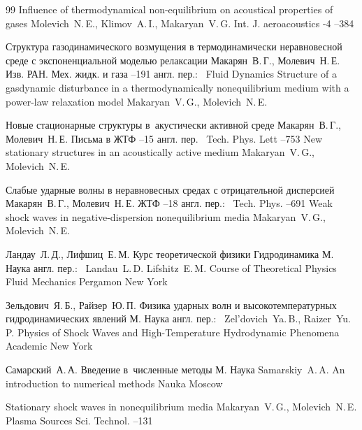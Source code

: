 \begin{thebibliography}{99}
\paper Influence of thermodynamical non-equilibrium on acoustical properties of gases 
\by Molevich~N.\,E.,  Klimov~A.\,I., Makaryan~V.\,G. 
\jour Int. J. aeroacoustics 
-4 
--384


\paper Структура газодинамического возмущения в термодинамически неравновесной среде с экспоненциальной моделью
релаксации 
\by   Макарян~В.\,Г., Молевич~Н.\,Е. 
\jour Изв. РАН. Мех. жидк. и газа 
--191
\transl англ. пер.:~
\jour Fluid Dynamics
\paper Structure of a gasdynamic disturbance in a thermodynamically nonequilibrium medium with a power-law relaxation model
\by Makaryan~V.\,G., Molevich~N.\,E.



\paper Новые стационарные структуры в~акустически активной среде 
\by   Макарян~В.\,Г., Молевич~Н.\,Е.
\jour Письма в ЖТФ 
--15
\transl англ. пер.~
\jour Tech. Phys. Lett
--753
\paper New stationary structures in an acoustically active medium
\by Makaryan~V.\,G., Molevich~N.\,E.


\paper Слабые ударные волны в неравновесных средах с отрицательной дисперсией 
\by   Макарян~В.\,Г., Молевич~Н.\,Е. 
\jour  ЖТФ 
--18
\transl англ. пер.:~
\jour Tech. Phys.
--691
\paper Weak shock waves in negative-dispersion nonequilibrium media
\by  Makaryan~V.\,G.,  Molevich~N.\,E.


\by  Ландау~Л.\,Д.,  Лифшиц~Е.\,М. 
\book Курс теоретической физики 
\volinfo Гидродинамика 
\publaddr М. 
\publ Наука 
\transl англ. пер.:~
\by Landau~L.\,D.  Lifshitz~E.\,M.
\book Course of Theoretical Physics
\volinfo Fluid Mechanics 
\publ Pergamon
\publaddr New York


\by  Зельдович~Я.\,Б.,  Райзер~Ю.\,П. 
\book Физика ударных волн и высокотемпературных гидродинамических явлений 
\publaddr М. 
\publ Наука
\transl англ. пер.:~
\by  Zel'dovich~Ya.\,B.,  Raizer~Yu.\,P.
\book Physics of Shock Waves and High-Temperature Hydrodynamic Phenomena 
\publ Academic
\publaddr New York

\by  Самарский~А.\,А. 
\book Введение в~численные методы 
\publaddr М. 
\publ Наука 
\misctransl
\by Samarskiy~A.\,A. 
\book An introduction to numerical methods
\publ Nauka
\publaddr Moscow

\paper Stationary shock waves in nonequilibrium media 
\by   Makaryan~V.\,G.,  Molevich~N.\,E. 
\jour Plasma Sources Sci. Technol. 
--131


\end{thebibliography}


